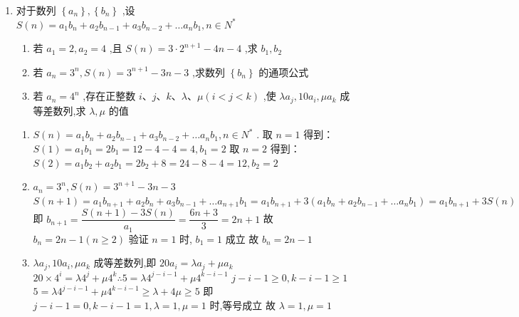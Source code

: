 \begin{enumerate}
    \item 对于数列 $ \left\{  {a}_{n}\right\}  ,\left\{  {b}_{n}\right\} $ ,设 $ S\left( n\right)  = {a}_{1}{b}_{n} + {a}_{2}{b}_{n - 1} + {a}_{3}{b}_{n - 2} + \ldots {a}_{n}{b}_{1},n \in  {N}^{ * } $ 
    \begin{enumerate}
        \item 若 $ {a}_{1} = 2,{a}_{2} = 4 $ ,且 $ S\left( n\right)  = 3 \cdot  {2}^{n + 1} - {4n} - 4 $ ,求 $ {b}_{1},{b}_{2} $
        \item 若 $ {a}_{n} = {3}^{n},S\left( n\right)  = {3}^{n + 1} - {3n} - 3 $ ,求数列 $ \left\{  {b}_{n}\right\} $ 的通项公式
        \item 若 $ {a}_{n} = {4}^{n} $ ,存在正整数 $ i\text{、}j\text{、}k\text{、}\lambda \text{、}\mu \left( {i < j < k}\right) $ ,使 $ \lambda {a}_{j},{10}{a}_{i},\mu {a}_{k} $ 成等差数列,求 $ \lambda ,\mu $ 的值
    \end{enumerate}
    \begin{jieda}
        \begin{enumerate}
            \item $ S\left( n\right)  = {a}_{1}{b}_{n} + {a}_{2}{b}_{n - 1} + {a}_{3}{b}_{n - 2} + \ldots {a}_{n}{b}_{1},n \in  {N}^{ * } $ .
            取 $ n = 1 $ 得到： $ S\left( 1\right)  = {a}_{1}{b}_{1} = 2{b}_{1} = {12} - 4 - 4 = 4,{b}_{1} = 2 $
            取 $ n = 2 $ 得到： $ S\left( 2\right)  = {a}_{1}{b}_{2} + {a}_{2}{b}_{1} = 2{b}_{2} + 8 = {24} - 8 - 4 = {12},{b}_{2} = 2 $
            \item $ {a}_{n} = {3}^{n},S\left( n\right)  = {3}^{n + 1} - {3n} - 3 $
            $ S\left( {n + 1}\right)  = {a}_{1}{b}_{n + 1} + {a}_{2}{b}_{n} + {a}_{3}{b}_{n - 1} + \ldots {a}_{n + 1}{b}_{1} = {a}_{1}{b}_{n + 1} + 3\left( {{a}_{1}{b}_{n} + {a}_{2}{b}_{n - 1} + \ldots {a}_{n}{b}_{1}}\right)  = {a}_{1}{b}_{n + 1} + {3S}\left( n\right) $ 即
            $ {b}_{n + 1} = \dfrac{S\left( {n + 1}\right)  - {3S}\left( n\right) }{{a}_{1}} = \dfrac{{6n} + 3}{3} = {2n} + 1 $
            故 $ {b}_{n} = {2n} - 1\left( {n \geq  2}\right) $ 验证 $ n = 1 $ 时, $ {b}_{1} = 1 $ 成立
            故 $ {b}_{n} = {2n} - 1 $
            \item $ \lambda {a}_{j},{10}{a}_{i},\mu {a}_{k} $ 成等差数列,即 $ {20}{a}_{i} = \lambda {a}_{j} + \mu {a}_{k} $
            $ {20} \times  {4}^{i} = \lambda {4}^{j} + \mu {4}^{k}\therefore 5 = \lambda {4}^{j - i - 1} + \mu {4}^{k - i - 1} $
            $ j - i - 1 \geq  0,k - i - 1 \geq  1 $
            $ 5 = \lambda {4}^{j - i - 1} + \mu {4}^{k - i - 1} \geq  \lambda  + {4\mu } \geq  5 $
            即 $ j - i - 1 = 0,k - i - 1 = 1,\lambda  = 1,\mu  = 1 $ 时,等号成立
            故 $ \lambda  = 1,\mu  = 1 $
        \end{enumerate}
    \end{jieda}
\end{enumerate}

